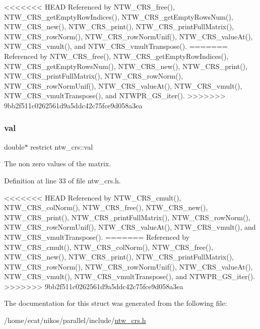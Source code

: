 <<<<<<< HEAD
Referenced by N\+T\+W\+\_\+\+C\+R\+S\+\_\+free(), N\+T\+W\+\_\+\+C\+R\+S\+\_\+get\+Empty\+Row\+Indices(), N\+T\+W\+\_\+\+C\+R\+S\+\_\+get\+Empty\+Rows\+Num(), N\+T\+W\+\_\+\+C\+R\+S\+\_\+new(), N\+T\+W\+\_\+\+C\+R\+S\+\_\+print(), N\+T\+W\+\_\+\+C\+R\+S\+\_\+print\+Full\+Matrix(), N\+T\+W\+\_\+\+C\+R\+S\+\_\+row\+Norm(), N\+T\+W\+\_\+\+C\+R\+S\+\_\+row\+Norm\+Unif(), N\+T\+W\+\_\+\+C\+R\+S\+\_\+value\+At(), N\+T\+W\+\_\+\+C\+R\+S\+\_\+vmult(), and N\+T\+W\+\_\+\+C\+R\+S\+\_\+vmult\+Transpose().
=======
Referenced by N\+T\+W\+\_\+\+C\+R\+S\+\_\+free(), N\+T\+W\+\_\+\+C\+R\+S\+\_\+get\+Empty\+Row\+Indices(), N\+T\+W\+\_\+\+C\+R\+S\+\_\+get\+Empty\+Rows\+Num(), N\+T\+W\+\_\+\+C\+R\+S\+\_\+new(), N\+T\+W\+\_\+\+C\+R\+S\+\_\+print(), N\+T\+W\+\_\+\+C\+R\+S\+\_\+print\+Full\+Matrix(), N\+T\+W\+\_\+\+C\+R\+S\+\_\+row\+Norm(), N\+T\+W\+\_\+\+C\+R\+S\+\_\+row\+Norm\+Unif(), N\+T\+W\+\_\+\+C\+R\+S\+\_\+value\+At(), N\+T\+W\+\_\+\+C\+R\+S\+\_\+vmult(), N\+T\+W\+\_\+\+C\+R\+S\+\_\+vmult\+Transpose(), and N\+T\+W\+P\+R\+\_\+\+G\+S\+\_\+iter().
>>>>>>> 9bb2f511c0262561d9a5ddc42c75fce9d058a3ea

\mbox{\label{structntw__crs_a5ed2cc918a69051b395e9b151a66867f}} 
\subsubsection{\texorpdfstring{val}{val}}
{\footnotesize\ttfamily double$\ast$ restrict ntw\+\_\+crs\+::val}

The non zero values of the matrix. 

Definition at line 33 of file ntw\+\_\+crs.\+h.



<<<<<<< HEAD
Referenced by N\+T\+W\+\_\+\+C\+R\+S\+\_\+cmult(), N\+T\+W\+\_\+\+C\+R\+S\+\_\+col\+Norm(), N\+T\+W\+\_\+\+C\+R\+S\+\_\+free(), N\+T\+W\+\_\+\+C\+R\+S\+\_\+new(), N\+T\+W\+\_\+\+C\+R\+S\+\_\+print(), N\+T\+W\+\_\+\+C\+R\+S\+\_\+print\+Full\+Matrix(), N\+T\+W\+\_\+\+C\+R\+S\+\_\+row\+Norm(), N\+T\+W\+\_\+\+C\+R\+S\+\_\+row\+Norm\+Unif(), N\+T\+W\+\_\+\+C\+R\+S\+\_\+value\+At(), N\+T\+W\+\_\+\+C\+R\+S\+\_\+vmult(), and N\+T\+W\+\_\+\+C\+R\+S\+\_\+vmult\+Transpose().
=======
Referenced by N\+T\+W\+\_\+\+C\+R\+S\+\_\+cmult(), N\+T\+W\+\_\+\+C\+R\+S\+\_\+col\+Norm(), N\+T\+W\+\_\+\+C\+R\+S\+\_\+free(), N\+T\+W\+\_\+\+C\+R\+S\+\_\+new(), N\+T\+W\+\_\+\+C\+R\+S\+\_\+print(), N\+T\+W\+\_\+\+C\+R\+S\+\_\+print\+Full\+Matrix(), N\+T\+W\+\_\+\+C\+R\+S\+\_\+row\+Norm(), N\+T\+W\+\_\+\+C\+R\+S\+\_\+row\+Norm\+Unif(), N\+T\+W\+\_\+\+C\+R\+S\+\_\+value\+At(), N\+T\+W\+\_\+\+C\+R\+S\+\_\+vmult(), N\+T\+W\+\_\+\+C\+R\+S\+\_\+vmult\+Transpose(), and N\+T\+W\+P\+R\+\_\+\+G\+S\+\_\+iter().
>>>>>>> 9bb2f511c0262561d9a5ddc42c75fce9d058a3ea



The documentation for this struct was generated from the following file\+:\begin{DoxyCompactItemize}
\item 
/home/ecat/nikos/parallel/include/\mbox{\hyperlink{ntw__crs_8h}{ntw\+\_\+crs.\+h}}\end{DoxyCompactItemize}
